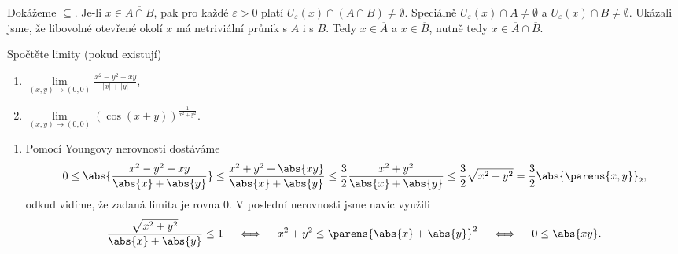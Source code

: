 \documentclass[answers]{exam}
\begin{document}
\begin{questions}
\begin{solution}
\begin{enumerate}[label=(\roman*)]
				Dok\'a\v zeme $\subseteq$. Je-li $x\in\overline {A \cap B}$, pak pro ka\v zd\'e $\varepsilon>0$ plat\'i $U_\varepsilon(x)\cap (A \cap B)\ne\emptyset$. Speci\'aln\v e $U_\varepsilon(x)\cap A\ne\emptyset$ a $U_\varepsilon(x)\cap B\ne\emptyset$.   Uk\'azali jsme, \v ze libovoln\'e otev\v ren\'e okol\'i $x$ m\'a netrivi\'aln\'i pr\r unik s $A$ i s $B$. Tedy $x\in\overline A$ a $x\in\overline B$, nutn\v e tedy $x\in\overline A\cap\overline B$.
		\end{enumerate}
	\end{solution}
	
	\question
	Spo\v ct\v ete limity (pokud existuj\'i)
	\begin{enumerate}[label=(\roman*)]
		\item $\lim\limits_{(x,y)\to(0,0)}\frac{x^2-y^2+xy}{|x|+|y|}$, 
		\item $\lim\limits_{(x,y)\to(0,0)}(\cos(x+y))^{\frac{1}{x^2+y^2}}$.
	\end{enumerate}
	
	\begin{solution}
	\begin{enumerate}[label=(\roman*)]
		\item \label{i}
			Pomocí Youngovy nerovnosti dostáváme
			\begin{equation*}
				0
				\le
				\abs{\frac{x^2 - y^2 + xy}{\abs{x} + \abs{y}}}
				\le
				\frac{x^2 + y^2 + \abs{xy}}{\abs{x} + \abs{y}}
				\le
				\frac{3}{2} \frac{x^2 + y^2}{\abs{x} + \abs{y}}
				\le
				\frac{3}{2} \sqrt{x^2 + y^2}
				=
				\frac{3}{2} {\abs{\parens{x, y}}}_{\mathrm{2}},
			\end{equation*}
			odkud vidíme, že zadaná limita je rovna 0. V poslední nerovnosti jsme navíc využili
			\begin{equation*}
				\frac{\sqrt{x^2 + y^2}}{\abs{x} + \abs{y}}
				\le
				1
				\quad \iff \quad
				x^2 + y^2
				\le
				\parens{\abs{x} + \abs{y}}^2
				\quad \iff \quad
				0
				\le
				\abs{xy}.
			\end{equation*}
			

\end{enumerate}
\end{solution}
\end{questions}
\end{document}
